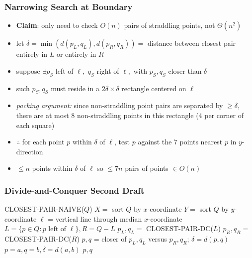 \documentclass{beamer}
\begin{document}
\begin{frame} \frametitle{Narrowing Search at Boundary}
\begin{itemize}
  \item \textbf{Claim}: only need to check $O(n)$ pairs of straddling points, not $\Theta(n^2)$
  \item let $\delta = \min(d(p_L, q_L), d(p_R, q_R)) = $ distance between closest
    pair entirely in $L$ or entirely in $R$
  \item suppose $\exists p_S$ left of $\ell,$ $q_S$ right of $\ell,$ with $p_S, q_S$ closer than $\delta$
  \item such $p_S, q_S$ must reside in a $2\delta \times \delta$ rectangle centered on $\ell$
  \item \emph{packing argument:} since non-straddling point pairs are separated by $\geq \delta,$
    there are at most 8 non-straddling points in this rectangle (4 per corner of each square)
  \item $\therefore$ for each point $p$ within $\delta$ of $\ell$, test $p$ against
    the 7 points nearest $p$ in $y$-direction
  \item $\leq n$ points within $\delta$ of $\ell$ so $\leq 7n$ pairs of points $\in O(n)$
\end{itemize}
\end{frame}

\begin{frame} \frametitle{Divide-and-Conquer Second Draft}
  {\footnotesize
\begin{algorithmic}[1]
      \State \Return CLOSEST-PAIR-NAIVE($Q$)
    \Else
      \State $X = $ sort $Q$ by $x$-coordinate
      \State $Y = $ sort $Q$ by $y$-coordinate
      \State $\ell$ = vertical line through median $x$-coordinate
      \State $L = \{p \in Q : p \text{ left of } \ell\}, R = Q-L$
      \State $p_L, q_L = $ CLOSEST-PAIR-DC($L$)
      \State $p_R, q_R = $ CLOSEST-PAIR-DC($R$)
      \State $p, q$ = closer of $p_L, q_L$ versus $p_R, q_R$; $\delta=d(p,q)$
            \State $p=a, q=b, \delta=d(a,b)$
          \EndIf
        \EndFor
      \EndFor
      \State \Return $p, q$
    \EndIf
  \EndFunction
\end{algorithmic}
}
\end{frame}
\end{document}
